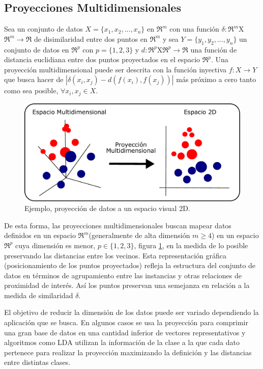 		\subsection{Proyecciones Multidimensionales}
		\begin{defn}
		 Sea un conjunto de datos $X=\{x_1,x_2,...,x_n\}$ en $\Re^m$ con una función $\delta:\Re^m$X$\Re^m \to \Re$ de disimilaridad entre dos puntos en $\Re^m$ y sea $Y=\{y_1,y_2,...,y_n\}$ un conjunto de datos en $\Re^p$ con $p=\{1,2,3\}$  y $d:\Re^p$X$\Re^p \to \Re$ una función de distancia euclidiana entre dos puntos proyectados en el espacio $\Re^p$. Una proyección multidimensional puede ser descrita con la función inyectiva $f:X \to Y$ que busca hacer de $|\delta(x_i,x_j)-d(f(x_i),f(x_j))|$ más próximo  a cero tanto como sea posible, $ \forall x_i,x_j \in X$.\end{defn} 
\begin{figure}[!h]
\centering
\includegraphics[width=0.6\columnwidth]{figs/PM.pdf}%
\caption{Ejemplo, proyección de datos a un espacio visual 2D.}%
\label{fig:PM}%
\end{figure}
De esta forma, las proyecciones multidimensionales buscan mapear datos definidos en un espacio $\Re^m$(generalmente de alta dimensión $m\geq 4$) en un espacio $\Re^p$ cuya dimensión es menor, $p  \in \{1,2,3\}$, figura \ref{fig:PM}, en la medida de lo posible preservando las distancias entre los vecinos. Esta representación gráfica (posicionamiento de los puntos proyectados) refleja la estructura del conjunto de datos en términos de agrupamiento entre las instancias y otras relaciones de proximidad de interés. Así los puntos preservan una semejanza en relación a la medida de similaridad $\delta$.

El objetivo de reducir la dimensión de los datos puede ser variado dependiendo la aplicación que se busca. En algunos casos se usa la proyección para comprimir una gran base de datos en una cantidad inferior de vectores  representativos \cite{Kohonen2001SM} y algoritmos como \ac{LDA} utilizan la información de la clase a la que cada dato pertenece para realizar la proyección maximizando la definición y las distancias entre distintas clases. 

